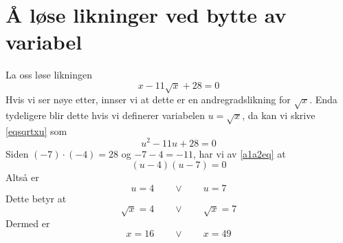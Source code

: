 



	
\section{Å løse likninger ved bytte av variabel}
La oss løse likningen 
\begin{equation}\label{eqsqrtxu}
	x-11\sqrt{x}+28=0
\end{equation}
Hvis vi ser nøye etter, innser vi at dette er en andregradslikning for $ \sqrt{x} $. Enda tydeligere blir dette hvis vi definerer variabelen $ u=\sqrt{x} $, da kan vi skrive \eqref{eqsqrtxu} som
\[ u^2-11u+28=0 \]
Siden $ (-7)\cdot(-4)=28 $ og $ -7-4=-11 $, har vi av \eqref{a1a2eq} at
\[ (u-4)(u-7)=0 \]
Altså er 
\[ u=4 \qquad \vee \qquad u=7 \]
Dette betyr at
\[ \sqrt{x}=4 \qquad \vee \qquad \sqrt{x}=7 \]
Dermed er
\[ x=16 \qquad \vee \qquad x=49 \]

